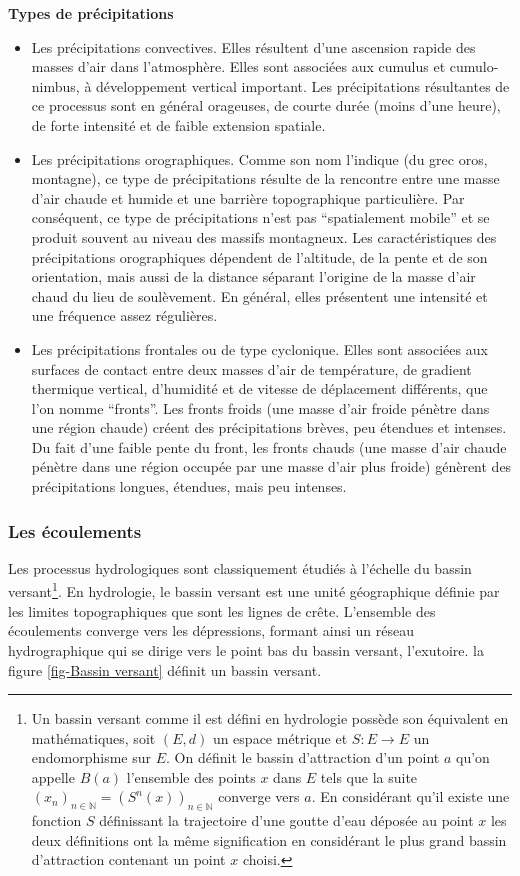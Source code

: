\documentclass[a4paper,11pt]{article}
\numberwithin{equation}{section}
\begin{document}
\noindent \textbf{Types de précipitations}

\begin{itemize}
	\item Les précipitations convectives. Elles résultent d'une ascension rapide des masses d'air dans l'atmosphère. Elles sont associées aux cumulus et cumulo-nimbus, à développement vertical important. Les précipitations résultantes de ce processus sont en général orageuses, de courte durée (moins d'une heure), de forte intensité et de faible extension spatiale.
	\item Les précipitations orographiques. Comme son nom l'indique (du grec oros, montagne), ce type de précipitations résulte de la rencontre entre une masse d'air chaude et humide et une barrière topographique particulière. Par conséquent, ce type de précipitations n’est pas ``spatialement mobile'' et se produit souvent au niveau des massifs montagneux. Les caractéristiques des précipitations orographiques dépendent de l'altitude, de la pente et de son orientation, mais aussi de la distance séparant l'origine de la masse d'air chaud du lieu de soulèvement. En général, elles présentent une intensité et une fréquence assez régulières.
	\item Les précipitations frontales ou de type cyclonique. Elles sont associées aux surfaces de contact entre deux masses d'air de température, de gradient thermique vertical, d'humidité et de vitesse de déplacement différents, que l'on nomme ``fronts''. Les fronts froids (une masse d’air froide pénètre dans une région chaude) créent des précipitations brèves, peu étendues et intenses. Du fait d’une faible pente du front, les fronts chauds (une masse d’air chaude pénètre dans une région occupée par une masse d’air plus froide) génèrent des précipitations longues, étendues, mais peu intenses.
\end{itemize}

\subsubsection{Les écoulements}
\label{ch:ecoulement}

Les processus hydrologiques sont classiquement étudiés à l’échelle du bassin versant\footnote{Un bassin versant comme il est défini en hydrologie possède son équivalent en mathématiques, soit $(E,d)$ un espace métrique et $S:E\to E$ un endomorphisme sur $E$. On définit le bassin d'attraction d'un point $a$ qu'on appelle $B(a)$ l'ensemble des points $x$ dans $E$ tels que la suite $(x_n)_{n \in \mathbb{N}}=(S^n(x))_{n \in \mathbb{N}}$ converge vers $a$. En considérant qu'il existe une fonction $S$ définissant la trajectoire d'une goutte d'eau déposée au point $x$ les deux définitions ont la même signification en considérant le plus grand bassin d'attraction contenant un point $x$ choisi.}. En hydrologie, le bassin versant est une unité géographique définie par les limites topographiques que sont les lignes de crête. L’ensemble des écoulements converge vers les dépressions, formant ainsi un réseau hydrographique qui se dirige vers le point bas du bassin versant, l’exutoire. la figure \ref{fig-Bassin versant} définit un bassin versant. 
\end{document}
